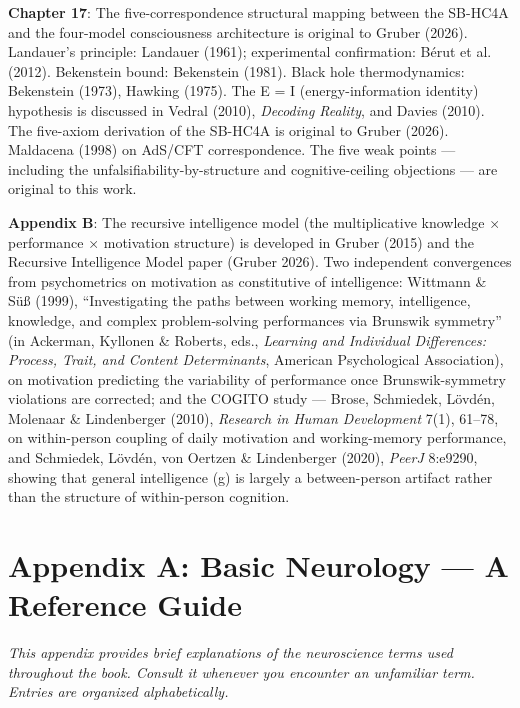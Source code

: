 \documentclass[11pt, twoside, openright]{book}
\begin{document}
\textbf{Chapter 17}: The five-correspondence structural mapping between the SB-HC4A and the four-model consciousness architecture is original to Gruber (2026). Landauer's principle: Landauer (1961); experimental confirmation: Bérut et al. (2012). Bekenstein bound: Bekenstein (1981). Black hole thermodynamics: Bekenstein (1973), Hawking (1975). The E = I (energy-information identity) hypothesis is discussed in Vedral (2010), \textit{Decoding Reality}, and Davies (2010). The five-axiom derivation of the SB-HC4A is original to Gruber (2026). Maldacena (1998) on AdS/\allowbreak{}CFT correspondence. The five weak points --- including the unfalsifiability-by-structure and cognitive-ceiling objections --- are original to this work.

\textbf{Appendix B}: The recursive intelligence model (the multiplicative knowledge × performance × motivation structure) is developed in Gruber (2015) and the Recursive Intelligence Model paper (Gruber 2026). Two independent convergences from psychometrics on motivation as constitutive of intelligence: Wittmann \& Süß (1999), ``Investigating the paths between working memory, intelligence, knowledge, and complex problem-solving performances via Brunswik symmetry'' (in Ackerman, Kyllonen \& Roberts, eds., \textit{Learning and Individual Differences: Process, Trait, and Content Determinants}, American Psychological Association), on motivation predicting the variability of performance once Brunswik-symmetry violations are corrected; and the COGITO study --- Brose, Schmiedek, Lövdén, Molenaar \& Lindenberger (2010), \textit{Research in Human Development} 7(1), 61--78, on within-person coupling of daily motivation and working-memory performance, and Schmiedek, Lövdén, von Oertzen \& Lindenberger (2020), \textit{PeerJ} 8:e9290, showing that general intelligence (g) is largely a between-person artifact rather than the structure of within-person cognition.


\chapter*{Appendix A: Basic Neurology --- A Reference Guide}

\textit{This appendix provides brief explanations of the neuroscience terms used throughout the book. Consult it whenever you encounter an unfamiliar term. Entries are organized alphabetically.}
\end{document}
